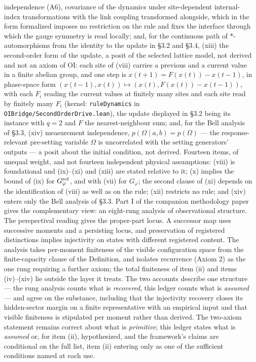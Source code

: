 \documentclass[
]{article}
\begin{document}
independence (A6), covariance of the dynamics under site-dependent
internal-index transformations with the link coupling transformed
alongside, which in the form formalized imposes no restriction on the
rule and fixes the interface through which the gauge symmetry is read
locally; and, for the continuous path of \(*\)-automorphisms from the
identity to the update in §3.2 and §3.4, (xiii) the second-order form of
the update, a posit of the selected lattice model, not derived and not
an axiom of OI: each site of (viii) carries a previous and a current
value in a finite abelian group, and one step is
\(x(t+1) = F(x(t)) - x(t-1)\), in phase-space form
\((x(t-1), x(t)) \mapsto (x(t), F(x(t)) - x(t-1))\), with each \(F_i\)
reading the current values at finitely many sites and each site read by
finitely many \(F_i\) (kernel: \texttt{ruleDynamics} in
\texttt{OIBridge/SecondOrderDrive.lean}), the update displayed in §3.2
being its instance with \(q = 2\) and \(F\) the nearest-neighbour sum;
and, for the Bell analysis of §3.3, (xiv) measurement independence,
\(p(\Omega\mid a,b)=p(\Omega)\) --- the response-relevant pre-setting
variable \(\Omega\) is uncorrelated with the setting generators' outputs
--- a posit about the initial condition, not derived. Fourteen items, of
unequal weight, and not fourteen independent physical assumptions:
(viii) is foundational and (ix)--(xi) and (xiii) are stated relative to
it; (x) implies the bound of (ix) for \(G_\varphi^{\rm ref}\), and with
(vii) for \(G_\varphi\); the second clause of (xi) depends on the
identification of (viii) as well as on the rule; (xii) restricts no
rule; and (xiv) enters only the Bell analysis of §3.3. Part I of the
companion methodology paper gives the complementary view: an eight-rung
analysis of observational structure. The perspectival reading gives the
proper-part locus. A successor map uses successive moments and a
persisting locus, and preservation of registered distinctions implies
injectivity on states with different registered content. The analysis
takes per-moment finiteness of the visible configuration space from the
finite-capacity clause of the Definition, and isolates recurrence (Axiom
2) as the one rung requiring a further axiom; the total finiteness of
item (ii) and items (iv)--(xiv) lie outside the layer it treats. The two
accounts describe one structure --- the rung analysis counts what is
\emph{recovered}, this ledger counts what is \emph{assumed} --- and
agree on the substance, including that the injectivity recovery closes
its hidden-sector margin on a finite representative with an empirical
input and that visible finiteness is stipulated per moment rather than
derived. The two-axiom statement remains correct about what is
\emph{primitive}; this ledger states what is \emph{assumed} or, for item
(ii), hypothesized, and the framework's claims are conditional on the
full list, item (ii) entering only as one of the sufficient conditions
named at each use.
\end{document}
